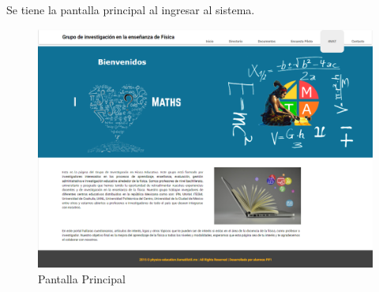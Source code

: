 Se tiene la pantalla principal al ingresar al sistema. 

\begin{figure}[hbtp]
		\centering
		\includegraphics[scale=0.3]{images/Interfaz/IUGS00_pantallaprincipal.png}
		\caption{Pantalla Principal}
	\end{figure}
	